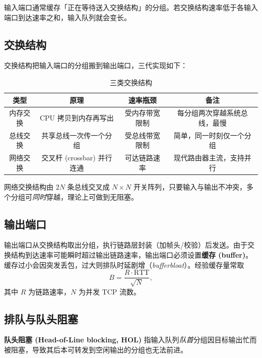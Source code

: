 输入端口通常缓存「正在等待送入交换结构」的分组。若交换结构速率低于各输入端口到达速率之和，输入队列就会变长。

\subsection{交换结构}

交换结构把输入端口的分组搬到输出端口，三代实现如下：

\begin{table}[H]
\centering
\caption{三类交换结构}
\begin{tabulary}{\textwidth}{CCCC}
\toprule
类型 & 原理 & 速率瓶颈 & 备注 \\
\midrule
内存交换 & CPU 拷贝到内存再写出 & 受内存带宽限制 & 每分组两次穿越系统总线，最慢 \\
总线交换 & 共享总线一次传一个分组 & 受总线带宽限制 & 简单，同一时刻仅一个分组 \\
网络交换 & 交叉杆 (crossbar) 并行连通 & 可达链路速率 & 现代路由器主流，支持并行 \\
\bottomrule
\end{tabulary}
\end{table}

网络交换结构由 $2N$ 条总线交叉成 $N\times N$ 开关阵列，只要输入与输出不冲突，多个分组可\emph{同时}穿越，理论上可做到无阻塞。

\subsection{输出端口}

输出端口从交换结构取出分组，执行链路层封装（加帧头/校验）后发送。由于交换结构到达速率可能瞬时超过输出链路速率，输出端口必须设置\textbf{缓存 (buffer)}。缓存过小会因突发丢包，过大则排队时延剧增（\emph{bufferbloat}）。经验缓存量常取
\begin{equation}
    B = \frac{R \cdot \text{RTT}}{\sqrt{N}},
\end{equation}
其中 $R$ 为链路速率，$N$ 为并发 TCP 流数。

\subsection{排队与队头阻塞}

\textbf{队头阻塞 (Head-of-Line blocking, HOL)} 指输入队列\emph{队首}分组因目标输出忙而被阻塞，导致其后本可转发到空闲输出的分组也无法前进。

